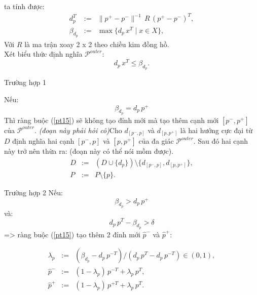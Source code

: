 \documentclass[11pt]{beamer}
\theoremstyle{definition}
\theoremstyle{plain}
\theoremstyle{plain}
\theoremstyle{remark}
\begin{document}
	\begin{frame}
	
		 ta tính được:\\
		\begin{equation}\label{def_d_p}
			\begin{array}{lcl}
				d_{p}^T &:=& \|p^+ - p^-\|^{-1}\, R \, (p^+ - p^-)^T, \\
				\beta_{d_{p}} &:=& \max\{d_{p}\, x^T \mid x \in X\},
			\end{array}
		\end{equation}
		Với $R$ là ma trận xoay 2 x 2 theo chiều kim đồng hồ.\\
		Xét biểu thức định nghĩa $\mathcal{P}^{outer}$:
		\begin{equation}\label{pt15}
			d_p\, x^T \leq \beta_{d_p}.
		\end{equation}
	\end{frame}
	\begin{frame}{Trường hợp 1}
		
		Nếu:
		\begin{equation}
			\label{betaequal}
			\beta_{d_p} = d_p\, p^+
		\end{equation}
		Thì ràng buộc (\ref{pt15}) sẽ không tạo đỉnh mới mà tạo thêm cạnh mới $[p^-, p^+]$ của $\mathcal{P}^{outer}$.\textit{ (đoạn này phải hỏi cô)}Cho $d_{[p^-, p]}$ và $d_{[p, p^+]}$ là hai hướng cực đại từ $D$ định nghĩa hai cạnh $[p^-, p]$ và $[p, p^+]$ của đa giác $\mathcal{P}^{outer}$. Sau đó hai cạnh này trở nên thừa ra: (đoạn này có thể nói mồm được).
			\begin{equation}\label{newDP2}
			\begin{array}{lcl}
				D &:=& (D \cup \{d_{p}\})\setminus \{d_{[p^-,p]}, d_{[p,p^+]}\}, \\
				P &:=& P \setminus \{p\}.
			\end{array}
		\end{equation}
	\end{frame}
	\begin{frame}{Trường hợp 2}
		 Nếu:
		\begin{equation}\label{betagreater}
			\beta_{d_p} > d_p\, p^+
		\end{equation}
		và:
		\begin{equation}\label{greaterdelta}
			d_{p}\, p^T - \beta_{d_{p}} > \delta
		\end{equation}
		=> ràng buộc (\ref{pt15}) tạo thêm 2 đỉnh mới $\hat p^-$ và $\hat p^+$:
	
			\begin{equation}\label{def_hatp}
				\begin{array}{lcl}
					\lambda_p &:=& (\beta_{d_p} - d_p\, p^{-T})/(d_p\, p^T - d_p\, p^{-T}) \in (0, 1), \\
					\hat p^- &:=& (1 - \lambda_p)\, p^{-T} + \lambda_p\, p^T, \\
					\hat p^+ &:=& (1 - \lambda_p)\, p^{+T} + \lambda_p\, p^T.
				\end{array}
			\end{equation}
		
	\end{frame}
	
\end{document}
